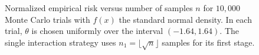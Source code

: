 \begin{figure}
\begin{center}




\caption{Normalized empirical risk versus number of samples $n$ for $10,000$ Monte Carlo trials with $f(x)$ the standard normal density. In each trial, $\theta$ is chosen uniformly over the interval $(-1.64,1.64)$. The single interaction strategy uses $n_1 = \lfloor \sqrt{n} \rfloor$ samples for its first stage. 
\label{fig:adaptive_error}  }
\end{center}
\end{figure}

